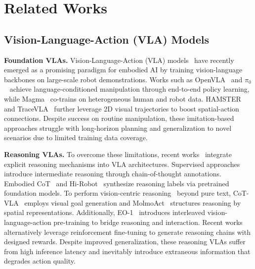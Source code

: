 \section{Related Works}
\label{sec:related_works}

\subsection{Vision-Language-Action (VLA) Models}

\noindent\textbf{Foundation VLAs.}
Vision-Language-Action (VLA) models~\cite{brohan2022rt,brohan2023rt,team2024octo,bjorck2025gr00t,li2025hamster,black2024pi_0,yang2025magma,pertsch2025fast,driess2025knowledge,bu2025agibot,team2025gemini,wang2025vla} have recently emerged as a promising paradigm for embodied AI by training vision-language backbones on large-scale robot demonstrations. Works such as OpenVLA~\cite{kim24openvla} and $\pi_0$~\cite{black2024pi_0} achieve language-conditioned manipulation through end-to-end policy learning, while Magma~\cite{yang2025magma} co-trains on heterogeneous human and robot data. HAMSTER~\cite{li2025hamster} and TraceVLA~\cite{zheng2024tracevla} further leverage 2D visual trajectories to boost spatial-action connections. Despite success on routine manipulation, these imitation-based approaches struggle with long-horizon planning and generalization to novel scenarios due to limited training data coverage.

\vspace{2mm}

\noindent\textbf{Reasoning VLAs.}
To overcome these limitations, recent works~\cite{zawalski2024robotic,zhao2025cot,lee2025molmoact,wu2025you,qu2025eo,huang2025thinkact,kim2025robot,yuan2025embodied,abdolmaleki2025gemini} integrate explicit reasoning mechanisms into VLA architectures. Supervised approaches~\cite{zawalski2024robotic,zhao2025cot,lee2025molmoact,qu2025eo} introduce intermediate reasoning through chain-of-thought annotations. Embodied CoT~\cite{zawalski2024robotic} and Hi-Robot~\cite{shi2025hi} synthesize reasoning labels via pretrained foundation models. To perform vision-centric reasoning~\cite{man2025argus,sarch2025grounded} beyond pure text, CoT-VLA~\cite{zhao2025cot} employs visual goal generation and MolmoAct~\cite{lee2025molmoact} structures reasoning by spatial representations. Additionally, EO-1~\cite{qu2025eo} introduces interleaved vision-language-action pre-training to bridge reasoning and interaction. Recent works~\cite{yuan2025embodied,huang2025thinkact} alternatively leverage reinforcement fine-tuning to generate reasoning chains with designed rewards. Despite improved generalization, these reasoning VLAs suffer from high inference latency and inevitably introduce extraneous information that degrades action quality.


